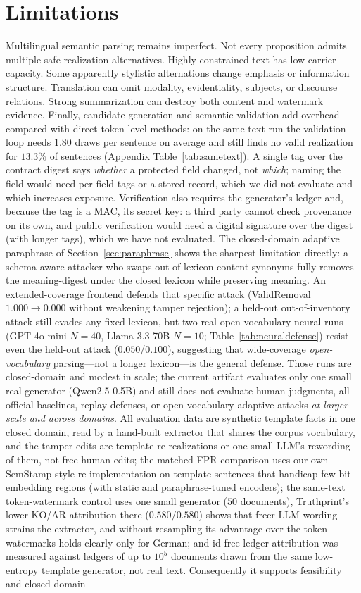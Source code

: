 \documentclass[journal]{IEEEtran}
\begin{document}
\section*{Limitations}
Multilingual semantic parsing remains imperfect. Not every proposition admits multiple safe realization alternatives. Highly constrained text has low carrier capacity. Some apparently stylistic alternations change emphasis or information structure. Translation can omit modality, evidentiality, subjects, or discourse relations. Strong summarization can destroy both content and watermark evidence. Finally, candidate generation and semantic validation add overhead compared with direct token-level methods: on the same-text run the validation loop needs $1.80$ draws per sentence on average and still finds no valid realization for $13.3\%$ of sentences (Appendix Table~\ref{tab:sametext}). A single tag over the contract digest says \emph{whether} a protected field changed, not \emph{which}; naming the field would need per-field tags or a stored record, which we did not evaluate and which increases exposure. Verification also requires the generator's ledger and, because the tag is a MAC, its secret key: a third party cannot check provenance on its own, and public verification would need a digital signature over the digest (with longer tags), which we have not evaluated. The closed-domain adaptive paraphrase of Section~\ref{sec:paraphrase} shows the sharpest limitation directly: a schema-aware attacker who swaps out-of-lexicon content synonyms fully removes the meaning-digest under the closed lexicon while preserving meaning. An extended-coverage frontend defends that specific attack (ValidRemoval $1.000\!\to\!0.000$ without weakening tamper rejection); a held-out out-of-inventory attack still evades any fixed lexicon, but two real open-vocabulary neural runs (GPT-4o-mini $N{=}40$, Llama-3.3-70B $N{=}10$; Table~\ref{tab:neuraldefense}) resist even the held-out attack ($0.050$/$0.100$), suggesting that wide-coverage \emph{open-vocabulary} parsing---not a longer lexicon---is the general defense. Those runs are closed-domain and modest in scale; the current artifact evaluates only one small real generator (Qwen2.5-0.5B) and still does not evaluate human judgments, all official baselines, replay defenses, or open-vocabulary adaptive attacks \emph{at larger scale and across domains}. All evaluation data are synthetic template facts in one closed domain, read by a hand-built extractor that shares the corpus vocabulary, and the tamper edits are template re-realizations or one small LLM's rewording of them, not free human edits; the matched-FPR comparison uses our own SemStamp-style re-implementation on template sentences that handicap few-bit embedding regions (with static and paraphrase-tuned encoders); the same-text token-watermark control uses one small generator ($50$ documents), Truthprint's lower KO/AR attribution there ($0.580$/$0.580$) shows that freer LLM wording strains the extractor, and without resampling its advantage over the token watermarks holds clearly only for German; and id-free ledger attribution was measured against ledgers of up to $10^5$ documents drawn from the same low-entropy template generator, not real text. Consequently it supports feasibility and closed-domain 
\end{document}
